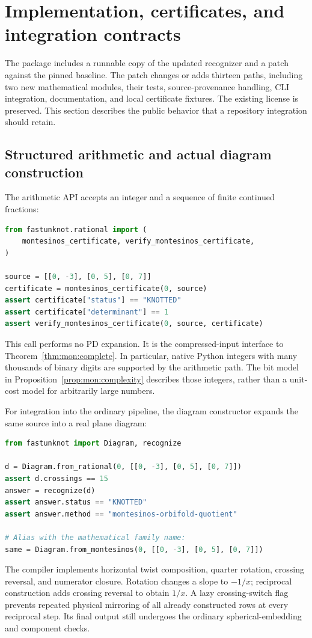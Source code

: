\section{Implementation, certificates, and integration contracts}
\label{sec:implementation}

The package includes a runnable copy of the updated  recognizer
and a patch against the pinned baseline. The patch changes or adds thirteen
paths, including two new mathematical modules, their tests, source-provenance
handling, CLI integration, documentation, and local certificate fixtures.
The existing license is preserved. This section describes the public
behavior that a repository integration should retain.

\subsection{Structured arithmetic and actual diagram construction}

The arithmetic API accepts an integer and a sequence of finite continued
fractions:
\begin{lstlisting}[language=Python]
from fastunknot.rational import (
    montesinos_certificate, verify_montesinos_certificate,
)

source = [[0, -3], [0, 5], [0, 7]]
certificate = montesinos_certificate(0, source)
assert certificate["status"] == "KNOTTED"
assert certificate["determinant"] == 1
assert verify_montesinos_certificate(0, source, certificate)
\end{lstlisting}
This call performs no PD expansion. It is the compressed-input interface
to Theorem~\ref{thm:mon:complete}. In particular, native Python integers
with many thousands of binary digits are supported by the arithmetic path.
The bit model in Proposition~\ref{prop:mon:complexity} describes those
integers, rather than a unit-cost model for arbitrarily large numbers.

For integration into the ordinary pipeline, the diagram constructor expands
the same source into a real plane diagram:
\begin{lstlisting}[language=Python]
from fastunknot import Diagram, recognize

d = Diagram.from_rational(0, [[0, -3], [0, 5], [0, 7]])
assert d.crossings == 15
answer = recognize(d)
assert answer.status == "KNOTTED"
assert answer.method == "montesinos-orbifold-quotient"

# Alias with the mathematical family name:
same = Diagram.from_montesinos(0, [[0, -3], [0, 5], [0, 7]])
\end{lstlisting}
The compiler implements horizontal twist composition, quarter rotation,
crossing reversal, and numerator closure. Rotation changes a slope to
\(-1/x\); reciprocal construction adds crossing reversal to obtain \(1/x\).
A lazy crossing-switch flag prevents repeated physical mirroring of all
already constructed rows at every reciprocal step. Its final output still
undergoes the ordinary spherical-embedding and component checks.

